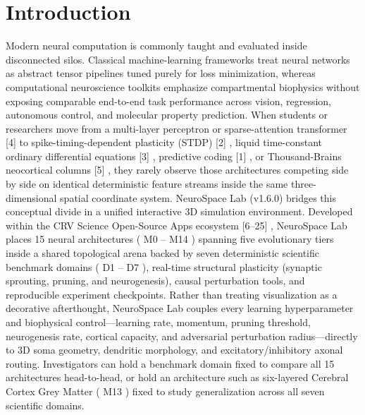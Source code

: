\documentclass[10pt,letterpaper]{article}
\begin{document}
\section{Introduction}
Modern neural computation is commonly taught and evaluated inside disconnected silos. Classical machine-learning frameworks treat neural networks as abstract tensor pipelines tuned purely for loss minimization, whereas computational neuroscience toolkits emphasize compartmental biophysics without exposing comparable end-to-end task performance across vision, regression, autonomous control, and molecular property prediction. When students or researchers move from a multi-layer perceptron or sparse-attention transformer [4] to spike-timing-dependent plasticity (STDP) [2] , liquid time-constant ordinary differential equations [3] , predictive coding [1] , or Thousand-Brains neocortical columns [5] , they rarely observe those architectures competing side by side on identical deterministic feature streams inside the same three-dimensional spatial coordinate system. NeuroSpace Lab (v1.6.0) bridges this conceptual divide in a unified interactive 3D simulation environment. Developed within the CRV Science Open-Source Apps ecosystem [6--25] , NeuroSpace Lab places 15 neural architectures ( M0 -- M14 ) spanning five evolutionary tiers inside a shared topological arena backed by seven deterministic scientific benchmark domains ( D1 -- D7 ), real-time structural plasticity (synaptic sprouting, pruning, and neurogenesis), causal perturbation tools, and reproducible experiment checkpoints. Rather than treating visualization as a decorative afterthought, NeuroSpace Lab couples every learning hyperparameter and biophysical control---learning rate, momentum, pruning threshold, neurogenesis rate, cortical capacity, and adversarial perturbation radius---directly to 3D soma geometry, dendritic morphology, and excitatory/inhibitory axonal routing. Investigators can hold a benchmark domain fixed to compare all 15 architectures head-to-head, or hold an architecture such as six-layered Cerebral Cortex Grey Matter ( M13 ) fixed to study generalization across all seven scientific domains.
\end{document}
